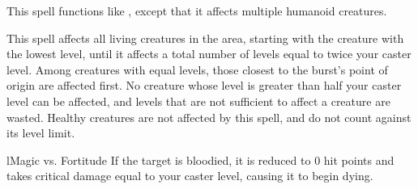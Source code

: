 \begin{spellheader}
\end{spellheader}
\begin{spelleffects}
    \spellsuccess This spell functions like , except that it affects multiple humanoid creatures.
\end{spelleffects}
\begin{spellfooter}

\end{spellfooter}

\begin{spellheader}
\end{spellheader}
\begin{spelleffects}
    \spelleffect This spell affects all \bloodied living creatures in the area, starting with the creature with the lowest level, until it affects a total number of levels equal to twice your caster level. Among creatures with equal levels, those closest to the burst's point of origin are affected first. No creature whose level is greater than half your caster level can be affected, and levels that are not sufficient to affect a creature are wasted. Healthy creatures are not affected by this spell, and do not count against its level limit.
    \begin{spellattack}l{Magic vs. Fortitude}
        \spellsuccess If the target is bloodied, it is reduced to 0 hit points and takes critical damage equal to your caster level, causing it to begin dying.
    \end{spellattack}
\end{spelleffects}
\begin{spellfooter}

\end{spellfooter}

